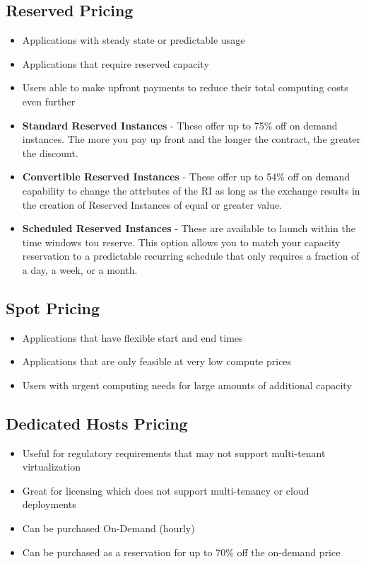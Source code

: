 \documentclass{article}
\begin{document}
\subsection{Reserved Pricing}
\begin{itemize}
\item
Applications with steady state or predictable usage

\item
Applications that require reserved capacity

\item
Users able to make upfront payments to reduce their total computing costs even further

\item
\textbf{Standard Reserved Instances} - These offer up to 75\% off on demand instances. The more you pay up front and the longer the contract, the greater the discount.

\item
\textbf{Convertible Reserved Instances} - These offer up to 54\% off on demand capability to change the attrbutes of the RI as long as the exchange results in the creation of Reserved Instances of equal or greater value.

\item
\textbf{Scheduled Reserved Instances} - These are available to launch within the time windows tou reserve. This option allows you to match your capacity reservation to a predictable recurring schedule that only requires a fraction of a day, a week, or a month.
\end{itemize}

\subsection{Spot Pricing}
\begin{itemize}
\item
Applications that have flexible start and end times

\item
Applications that are only feasible at very low compute prices

\item
Users with urgent computing needs for large amounts of additional capacity
\end{itemize}

\subsection{Dedicated Hosts Pricing}
\begin{itemize}
\item
Useful for regulatory requirements that may not support multi-tenant virtualization

\item
Great for licensing which does not support multi-tenancy or cloud deployments

\item
Can be purchased On-Demand (hourly)

\item
Can be purchased as a reservation for up to 70\% off the on-demand price
\end{itemize}
\end{document}
